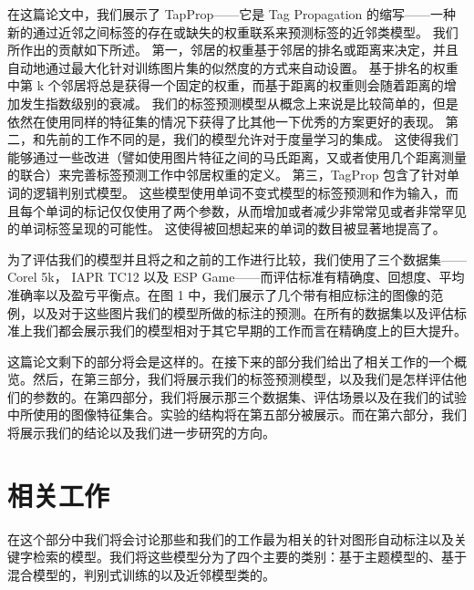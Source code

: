 \documentclass[a4paper,twocolumn]{ctexart}
\begin{document}
在这篇论文中，我们展示了 TapProp——它是 Tag Propagation 的缩写——一种新的通过近邻之间标签的存在或缺失的权重联系来预测标签的近邻类模型。
我们所作出的贡献如下所述。
第一，邻居的权重基于邻居的排名或距离来决定，并且自动地通过最大化针对训练图片集的似然度的方式来自动设置。
基于排名的权重中第 k 个邻居将总是获得一个固定的权重，而基于距离的权重则会随着距离的增加发生指数级别的衰减。
我们的标签预测模型从概念上来说是比较简单的，但是依然在使用同样的特征集的情况下获得了比其他一下优秀的方案更好的表现。
第二，和先前的工作不同的是，我们的模型允许对于度量学习的集成。
这使得我们能够通过一些改进（譬如使用图片特征之间的马氏距离，又或者使用几个距离测量的联合）来完善标签预测工作中邻居权重的定义。
第三，TagProp 包含了针对单词的逻辑判别式模型。
这些模型使用单词不变式模型的标签预测和作为输入，而且每个单词的标记仅仅使用了两个参数，从而增加或者减少非常常见或者非常罕见的单词标签呈现的可能性。
这使得被回想起来的单词的数目被显著地提高了。

为了评估我们的模型并且将之和之前的工作进行比较，我们使用了三个数据集—— Corel 5k， IAPR TC12 以及 ESP Game——而评估标准有精确度、回想度、平均准确率以及盈亏平衡点。在图 1 中，我们展示了几个带有相应标注的图像的范例，以及对于这些图片我们的模型所做的标注的预测。在所有的数据集以及评估标准上我们都会展示我们的模型相对于其它早期的工作而言在精确度上的巨大提升。

这篇论文剩下的部分将会是这样的。在接下来的部分我们给出了相关工作的一个概览。然后，在第三部分，我们将展示我们的标签预测模型，以及我们是怎样评估他们的参数的。在第四部分，我们将展示那三个数据集、评估场景以及在我们的试验中所使用的图像特征集合。实验的结构将在第五部分被展示。而在第六部分，我们将展示我们的结论以及我们进一步研究的方向。

\part{相关工作}

在这个部分中我们将会讨论那些和我们的工作最为相关的针对图形自动标注以及关键字检索的模型。我们将这些模型分为了四个主要的类别：基于主题模型的、基于混合模型的，判别式训练的以及近邻模型类的。



\newpage
\end{document}

